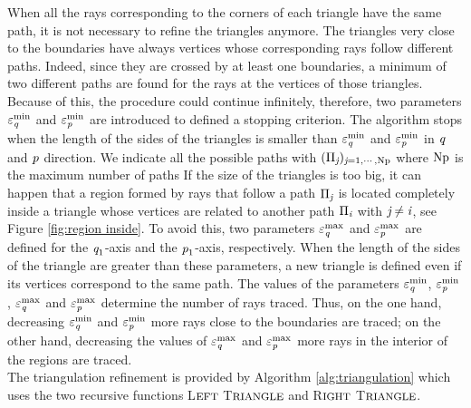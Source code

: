When all the rays corresponding to the corners of each triangle have the same path, it is not necessary to refine the triangles anymore.
The triangles very close to the boundaries have always vertices whose corresponding rays follow different paths.
Indeed, since they are crossed by at least one boundaries, a minimum of two different paths are found for the rays at the vertices of those triangles. 
Because of this, the procedure could continue infinitely, therefore, two parameters $\varepsilon_{\textit{q}}^\textrm{min}$ and $\varepsilon_{\textit{p}}^\textrm{min}$ are introduced to defined a stopping criterion.
The algorithm stops when the length of the sides of the triangles is smaller than $\varepsilon_{\textit{q}}^\textrm{min}$ and $\varepsilon_{\textit{p}}^\textrm{min}$ in $\textit{q}$ and $\textit{p}$ direction.
We indicate all the possible paths with $(\Pi_{\textit{j}})_{\textit{j}=1, \cdots, \textrm{Np}}$ where $\textrm{Np}$ is the maximum number of paths%
If the size of the triangles is too big, it can happen that a region formed by rays that follow a path $\Pi_{\textit{j}}$ is located completely inside a triangle whose vertices are related to another path $\Pi_{\textit{i}}$ with $\textit{j} \neq  \textit{i}$, see Figure \ref{fig:region inside}.
To avoid this, two parameters $\varepsilon_{\textit{q}}^{\textrm{max}}$ and $\varepsilon_{\textit{p}}^{\textrm{max}}$ are defined for the $\textit{q}_1$-axis and the $\textit{p}_1$-axis, respectively.
When the length of the sides of the triangle are greater than these parameters, a new triangle is defined even if its vertices correspond to the same path.
The values of the parameters $\varepsilon_{\textit{q}}^\textrm{min}$, $\varepsilon_{\textit{p}}^\textrm{min}$, $\varepsilon_{\textit{q}}^\textrm{max}$ and $\varepsilon_{\textit{p}}^\textrm{max}$ determine the number of rays traced.
Thus, on the one hand, decreasing $\varepsilon_{\textit{q}}^\textrm{min}$ and $\varepsilon_{\textit{p}}^\textrm{min}$ more rays close to the boundaries are traced;
on the other hand, decreasing the values of $\varepsilon_{\textit{q}}^\textrm{max}$ and $\varepsilon_{\textit{p}}^\textrm{max}$ more rays in the interior of the regions are traced. \\ \indent The triangulation refinement is provided by Algorithm \ref{alg:triangulation} which uses the two recursive functions L$\footnotesize{\textrm{EFT}}$ T$\footnotesize{\textrm{RIANGLE}}$ and  R$\footnotesize{\textrm{IGHT}}$ T$\footnotesize{\textrm{RIANGLE}}$.
